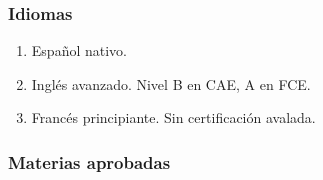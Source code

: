 \documentclass[a4paper,11pt]{article}
\begin{document}
\subsubsection{Idiomas}

\begin{enumerate}

  \item Español nativo.

  \item Inglés avanzado. Nivel B en CAE, A en FCE.

  \item Francés principiante. Sin certificación avalada.

\end{enumerate}

\subsubsection{Materias aprobadas}
\end{document}
